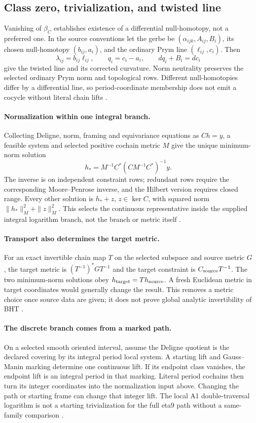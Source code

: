 \documentclass[11pt]{article}
\begin{document}
\subsection{Class zero, trivialization, and twisted line}
\label{sec:fsb03h}
Vanishing of $\beta_C$ establishes existence of a differential
null-homotopy, not a preferred one. In the source conventions let the gerbe
be $(\alpha_{ijk},A_{ij},B_i)$, its chosen null-homotopy $(b_{ij},a_i)$,
and the ordinary Prym line $(\ell_{ij},c_i)$. Then
\[
 \lambda_{ij}=b_{ij}\ell_{ij},\qquad q_i=c_i-a_i,
 \qquad dq_i+B_i=dc_i
\]
give the twisted line and its corrected curvature. Norm neutrality preserves
the selected ordinary Prym norm and topological rows. Different
null-homotopies differ by a differential line, so period-coordinate membership
does not emit a cocycle without literal chain lifts \cite{FSB03h}.

\paragraph{Normalization within one integral branch.}\label{sec:fsb03i}
Collecting Deligne, norm, framing and equivariance equations as $Ch=y$, a
feasible system and selected positive cochain metric $M$ give the unique
minimum-norm solution
\[
 h_*=M^{-1}C^*(CM^{-1}C^*)^{-1}y.
\]
The inverse is on independent constraint rows; redundant rows require the
corresponding Moore--Penrose inverse, and the Hilbert version requires closed
range. Every other solution is $h_*+z$, $z\in\ker C$, with squared norm
$\|h_*\|_M^2+\|z\|_M^2$. This selects the continuous representative inside
the supplied integral logarithm branch, not the branch or metric itself
\cite{FSB03i}.

\paragraph{Transport also determines the target metric.}\label{sec:fsb03j}
For an exact invertible chain map $T$ on the selected subspace and source
metric $G$, the target metric is $(T^{-1})^*GT^{-1}$ and the target
constraint is $C_{\rm source}T^{-1}$. The two minimum-norm solutions obey
$h_{\rm target}=Th_{\rm source}$. A fresh Euclidean metric in target
coordinates would generally change the result. This removes a metric choice
once source data are given; it does not prove global analytic invertibility
of BHT \cite{FSB03j}.

\paragraph{The discrete branch comes from a marked path.}\label{sec:fsb03k}
On a selected smooth oriented interval, assume the Deligne quotient is the
declared covering by its integral period local system. A starting lift and
Gauss--Manin marking determine one continuous lift. If its endpoint class
vanishes, the endpoint lift is an integral period in that marking. Literal
period cochains then turn its integer coordinates into the normalization
input above. Changing the path or starting frame can change that integer
lift. The local A1 double-traversal logarithm is not a starting trivialization
for the full eta9 path without a same-family comparison \cite{FSB03k}.
\end{document}

